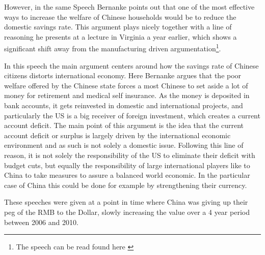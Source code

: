 However, in the same Speech Bernanke points out that one of the most 
effective ways to increase the welfare of Chinese households would be to 
reduce the domestic savings rate. This argument plays nicely together 
with a line of reasoning he presents at a lecture in Virginia a year 
earlier, which shows a significant shift away from the manufacturing 
driven argumentation\footnote{The speech can be read found here 
\cite{Bernanke05}}.

In this speech the main argument centers around how the savings rate 
of Chinese citizens distorts international economy. Here Bernanke argues 
that the poor welfare offered by the Chinese state forces a most Chinese 
to set aside a lot of money for retirement and medical self insurance.  
As the money is deposited in bank accounts, it gets reinvested in 
domestic and international projects, and particularly the US is a big 
receiver of foreign investment, which creates a current account deficit.  
The main point of this argument is the idea that the current account 
deficit or surplus is largely driven by the international economic 
environment and as such is not solely a domestic issue. Following this 
line of reason, it is not solely the responsibility of the US to 
eliminate their deficit with budget cuts, but equally the responsibility 
of large international players like to China to take measures to assure 
a balanced world economic. In the particular case of China this could be 
done for example by strengthening their currency.

These speeches were given at a point in time where China was giving up 
their peg of the RMB to the Dollar, slowly increasing the value over a 4 
year period between 2006 and 2010.




